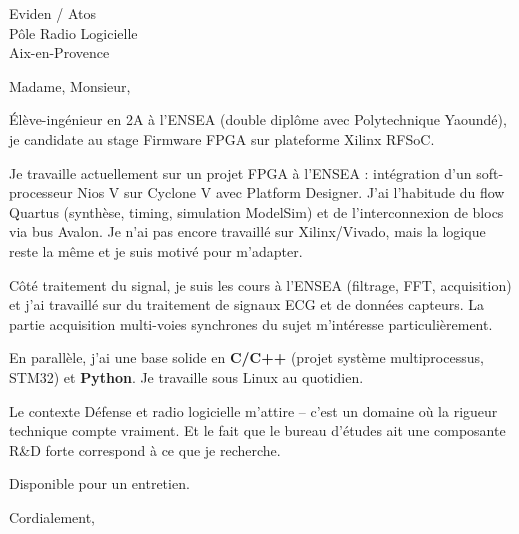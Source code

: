 \documentclass[11pt,a4paper]{letter}
\begin{document}
\begin{letter}{Eviden / Atos\\
Pôle Radio Logicielle\\
Aix-en-Provence}

\opening{Madame, Monsieur,}

Élève-ingénieur en 2A à l'ENSEA (double diplôme avec Polytechnique Yaoundé), je candidate au stage Firmware FPGA sur plateforme Xilinx RFSoC.

Je travaille actuellement sur un projet FPGA à l'ENSEA : intégration d'un soft-processeur Nios V sur Cyclone V avec Platform Designer. J'ai l'habitude du flow Quartus (synthèse, timing, simulation ModelSim) et de l'interconnexion de blocs via bus Avalon. Je n'ai pas encore travaillé sur Xilinx/Vivado, mais la logique reste la même et je suis motivé pour m'adapter.

Côté traitement du signal, je suis les cours à l'ENSEA (filtrage, FFT, acquisition) et j'ai travaillé sur du traitement de signaux ECG et de données capteurs. La partie acquisition multi-voies synchrones du sujet m'intéresse particulièrement.

En parallèle, j'ai une base solide en \textbf{C/C++} (projet système multiprocessus, STM32) et \textbf{Python}. Je travaille sous Linux au quotidien.

Le contexte Défense et radio logicielle m'attire -- c'est un domaine où la rigueur technique compte vraiment. Et le fait que le bureau d'études ait une composante R\&D forte correspond à ce que je recherche.

Disponible pour un entretien.

\closing{Cordialement,}

\end{letter}
\end{document}

